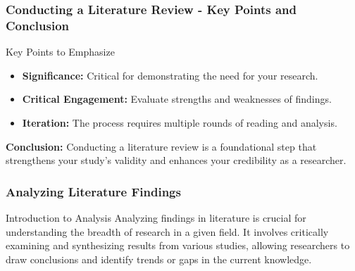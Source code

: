 \documentclass[aspectratio=169]{beamer}
\begin{document}
\begin{frame}[fragile]
    \frametitle{Conducting a Literature Review - Key Points and Conclusion}
    \begin{block}{Key Points to Emphasize}
        \begin{itemize}
            \item \textbf{Significance:} Critical for demonstrating the need for your research.
            \item \textbf{Critical Engagement:} Evaluate strengths and weaknesses of findings.
            \item \textbf{Iteration:} The process requires multiple rounds of reading and analysis.
        \end{itemize}
    \end{block}

    \vspace{0.5cm}
    \textbf{Conclusion:} Conducting a literature review is a foundational step that strengthens your study's validity and enhances your credibility as a researcher.
\end{frame}

\begin{frame}[fragile]
    \frametitle{Analyzing Literature Findings}
    \begin{block}{Introduction to Analysis}
        Analyzing findings in literature is crucial for understanding the breadth of research in a given field. It involves critically examining and synthesizing results from various studies, allowing researchers to draw conclusions and identify trends or gaps in the current knowledge.
    \end{block}
\end{frame}
\end{document}
